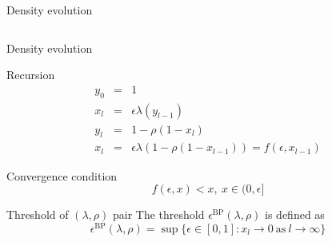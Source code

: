 \documentclass[10pt,xcolor=table]{beamer}
\begin{document}
\begin{frame}{Density evolution}
\begin{columns}
\begin{column}{0.5\textwidth}
\begin{centering}
\scalebox{0.6}{}
\end{centering}
\end{column}

\begin{column}{0.5\textwidth}
\end{column}
\end{columns}
\end{frame}
\begin{frame}{Density evolution}
\begin{block}{Recursion}
\begin{eqnarray*}
  y_0 &=& 1 \\
  x_l &=& \epsilon \lambda(y_{l-1}) \\
  y_l &=& 1-\rho(1-x_l) \\
  x_l &=& \epsilon \lambda(1-\rho(1-x_{l-1})) = f(\epsilon,x_{l-1})
\end{eqnarray*}
\end{block}

\begin{block}{Convergence condition}
\[
f(\epsilon,x) < x, \ x \in (0,\epsilon]
\]
\end{block}
\begin{block}{Threshold of $(\lambda,\rho)$ pair}
The threshold $\epsilon^{\text{BP}}(\lambda,\rho)$ is defined as
\[
\epsilon^{\text{BP}}(\lambda,\rho) = \sup \{\epsilon \in [0,1]: x_l \rightarrow 0 \ \text{as} \ l \rightarrow \infty \}
\]
\end{block}
\end{frame}
\end{document}
